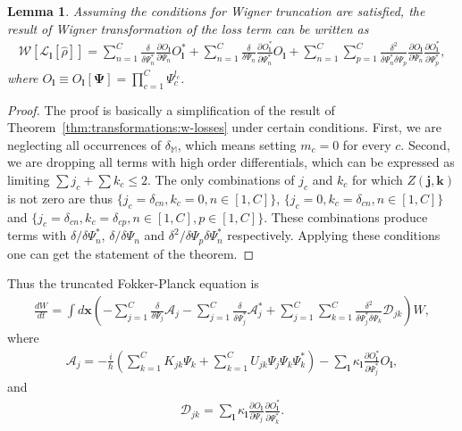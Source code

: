 \documentclass[12pt,aip,jmp,amssymb,amsmath]{revtex4-1}
\newtheorem{lemma}{Lemma}
\begin{document}
\begin{lemma}
    Assuming the conditions for Wigner truncation are satisfied, the result of Wigner transformation of the loss term can be written as
    \begin{eqnarray*}
        \mathcal{W}[\mathcal{L}_{\boldsymbol{l}}[\hat{\rho}]]
        = \sum_{n=1}^C
                \frac{\delta}{\delta \Psi_n^*} \frac{\partial O_{\boldsymbol{l}}}{\partial \Psi_n} O_{\boldsymbol{l}}^*
        + \sum_{n=1}^C
            \frac{\delta}{\delta \Psi_n} \frac{\partial O_{\boldsymbol{l}}^*}{\partial \Psi_n^*} O_{\boldsymbol{l}}
        + \sum_{n=1}^C \sum_{p=1}^C
            \frac{\delta^2}{\delta \Psi_n^* \delta \Psi_p}
            \frac{\partial O_{\boldsymbol{l}}}{\partial \Psi_n}
            \frac{\partial O_{\boldsymbol{l}}^*}{\partial \Psi_p^*},
    \end{eqnarray*}
    where $O_{\boldsymbol{l}} \equiv O_{\boldsymbol{l}}[\boldsymbol{\Psi}] = \prod_{c=1}^C \Psi_c^{l_c}$.
\end{lemma}
\begin{proof}
The proof is basically a simplification of the result of Theorem~\ref{thm:transformations:w-losses} under certain conditions.
First, we are neglecting all occurrences of $\delta_{\mathbb{M}}$, which means setting $m_c = 0$ for every $c$.
Second, we are dropping all terms with high order differentials,
which can be expressed as limiting $\sum j_c + \sum k_c \le 2$.
The only combinations of $j_c$ and $k_c$ for which $Z(\boldsymbol{j}, \boldsymbol{k})$ is not zero are thus
$\{ j_c = \delta_{cn}, k_c = 0, n \in [1, C] \}$,
$\{ j_c = 0, k_c = \delta_{cn}, n \in [1, C] \}$ and
$\{ j_c = \delta_{cn}, k_c = \delta_{cp}, n \in [1, C], p \in [1, C] \}$.
These combinations produce terms with $\delta/\delta \Psi_n^*$,
$\delta/\delta \Psi_n$ and
$\delta^2/\delta \Psi_p \delta \Psi_n^*$ respectively.
Applying these conditions one can get the statement of the theorem.
\end{proof}

Thus the truncated Fokker-Planck equation is
\begin{eqnarray}
    \frac{dW}{dt}
    = \int d\boldsymbol{x} \left(
        - \sum_{j=1}^C \frac{\delta}{\delta \Psi_j} \mathcal{A}_j
        - \sum_{j=1}^C \frac{\delta}{\delta \Psi_j^*} \mathcal{A}_j^*
        + \sum_{j=1}^C \sum_{k=1}^C \frac{\delta^2}{\delta \Psi_j^* \delta \Psi_k} \mathcal{D}_{jk}
    \right) W,
\end{eqnarray}
where
\begin{eqnarray}
    \mathcal{A}_j = -\frac{i}{\hbar} \left(
            \sum_{k=1}^C K_{jk} \Psi_k
            + \sum_{k=1}^C U_{jk} \Psi_j \Psi_k \Psi_k^*
        \right)
        - \sum_{\boldsymbol{l}} \kappa_{\boldsymbol{l}} \frac{\partial O_{\boldsymbol{l}}^*}{\partial \Psi_j^*} O_{\boldsymbol{l}},
\end{eqnarray}
and
\begin{eqnarray}
    \mathcal{D}_{jk} = \sum_{\boldsymbol{l}} \kappa_{\boldsymbol{l}}
        \frac{\partial O_{\boldsymbol{l}}}{\partial \Psi_j}
        \frac{\partial O_{\boldsymbol{l}}^*}{\partial \Psi_k^*}.
\end{eqnarray}
\end{document}
